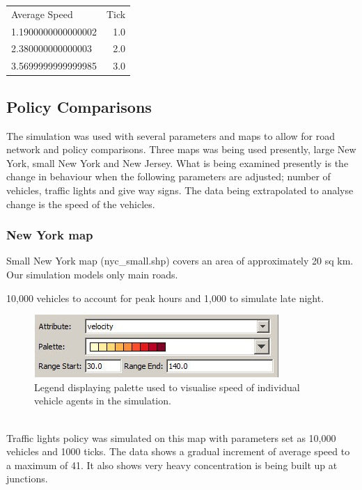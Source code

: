 \documentclass[11pt]{article}
\begin{document}
\begin{enumerate}
\begin{center}
\begin{tabular}{ l | r  }
\hline
Average Speed & Tick \\
1.1900000000000002 & 1.0 \\
2.380000000000003  &  2.0 \\
3.5699999999999985 & 3.0 \\
\hline
\end{tabular}
\end{center}




\subsection{Policy Comparisons}

The simulation was used with several parameters and maps to allow for road network and policy comparisons. Three maps was being used presently, large New York, small New York and New Jersey. What is being examined presently is the change in behaviour when the following parameters are adjusted; number of vehicles, traffic lights and give way signs. The data being extrapolated to analyse change is the speed of the vehicles.


\subsubsection{New York map}


Small New York map (nyc\_small.shp) covers an area of approximately 20 sq km. Our simulation models only main roads. 

10,000 vehicles to account for peak hours and 1,000 to simulate late night.


\begin{figure}[h]
\begin{center}
\includegraphics{legend}
\caption[scale=0.2]{Legend displaying palette used to visualise speed of individual
vehicle agents in the simulation.}
\end{center}
\end{figure}
\\


Traffic lights policy was simulated on this map with parameters set as 10,000 vehicles and 1000 ticks. The data shows a gradual increment of average speed to a maximum of 41. It also shows very heavy concentration is being built up at junctions.


\end{enumerate}
\end{document}

